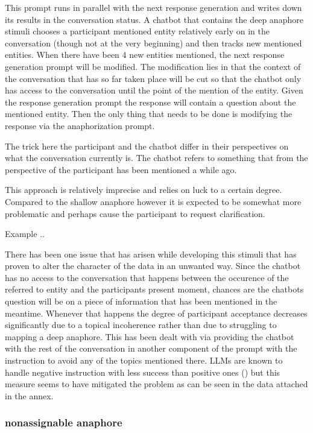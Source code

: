 \documentclass[12pt]{report}
\begin{document}
{This prompt runs in parallel with the next response generation
and writes down its results in the conversation status.
A chatbot that contains the deep anaphore stimuli
chooses a participant mentioned entity
relatively early on in the conversation
(though not at the very beginning)
and then tracks new mentioned entities.
When there have been 4 new entities mentioned,
the next response generation prompt will be modified.
The modification lies in that the context of the conversation
that has so far taken place
will be cut so
that the chatbot only has access
to the conversation until the point of the mention of the entity.
Given the response generation prompt
the response will contain a question
about the mentioned entity.
Then the only thing that needs to be done
is modifying the response via the anaphorization prompt.

The trick here the participant and the chatbot differ in their perspectives
on what the conversation currently is.
The chatbot refers to something
that from the perspective of the participant
has been mentioned a while ago.

This approach is relatively imprecise and relies on luck to a certain degree.
Compared to the shallow anaphore however
it is expected to be somewhat more problematic
and perhaps cause the participant to request clarification.

Example ..

\par
There has been one issue that has arisen while developing this stimuli
that has proven to alter the character of the data in an unwanted way.
Since the chatbot has no access to the conversation that happens
between the occurence of the referred to entity and the participants present moment,
chances are the chatbots question will be on
a piece of information that has been mentioned in the meantime.
Whenever that happens the degree of participant acceptance decreases significantly
due to a topical incoherence rather than
due to struggling to mapping a deep anaphore.
This has been dealt with via providing the chatbot
with the rest of the conversation in another component of the prompt
with the instruction to avoid any of the topics mentioned there.
LLMs are known to handle negative instruction with less success than positive ones ()
but this measure seems to have mitigated the problem
as can be seen in the data attached in the annex.

\subsubsection{nonassignable anaphore}

}
\end{document}
